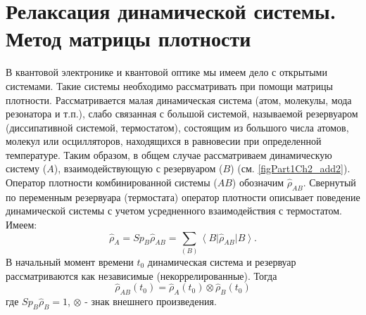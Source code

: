 \section{Релаксация динамической системы. Метод матрицы плотности}
В квантовой электронике и квантовой оптике мы имеем дело с открытыми
системами. Такие системы необходимо рассматривать при помощи
матрицы плотности. Рассматривается малая динамическая система
(атом, молекулы, мода резонатора и т.п.), слабо связанная с
большой системой, называемой резервуаром (диссипативной
системой, термостатом), состоящим из большого числа атомов,
молекул или осцилляторов, находящихся в равновесии при
определенной температуре. Таким образом, в общем случае
рассматриваем динамическую систему ($A$), взаимодействующую с
резервуаром ($B$) (см. \autoref{figPart1Ch2_add2}). Оператор
плотности комбинированной системы ($AB$) обозначим $\hat{\rho}_{AB}$.
Свернутый по переменным резервуара (термостата) оператор плотности
описывает поведение динамической системы с учетом усредненного
взаимодействия с термостатом. Имеем: 
\begin{equation}
\hat{\rho}_{A} = Sp_{B} \hat{\rho}_{AB} = 
\sum_{\left(B\right)}
\left<B\right|\hat{\rho}_{AB}\left|B\right>.
\end{equation}
В начальный момент времени $t_0$ динамическая система и резервуар
рассматриваются как независимые (некоррелированные). Тогда 
\begin{equation}
\hat{\rho}_{AB}\left(t_0\right) = 
\hat{\rho}_{A}\left(t_0\right)
\otimes
\hat{\rho}_{B}\left(t_0\right)
\end{equation}
где  $Sp_B \hat{\rho}_{B} = 1$, $\otimes$ - знак внешнего
произведения. 



